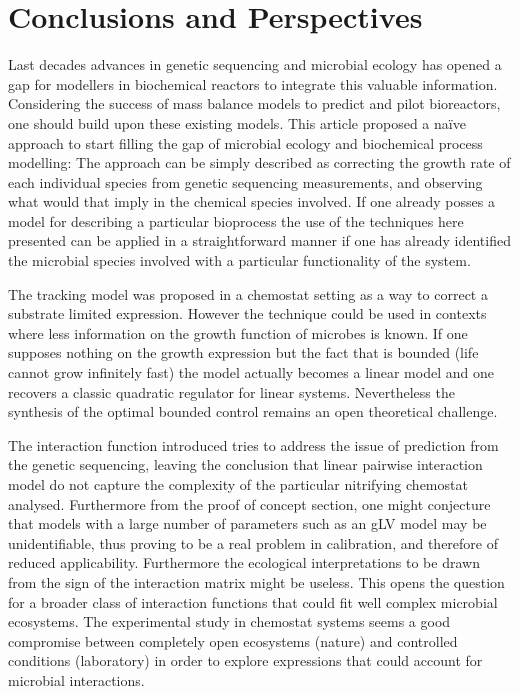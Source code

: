 \documentclass[3p,times]{elsarticle}
\begin{document}
\section{Conclusions and Perspectives}

Last decades advances in genetic sequencing and microbial ecology has opened a gap for modellers in biochemical reactors to integrate this valuable information. Considering the success of mass balance models to predict and pilot bioreactors, one should build upon these existing models. This article proposed a naïve approach to start filling the gap of microbial ecology and biochemical process modelling: The approach can be simply described as correcting the growth rate of each individual species from genetic sequencing measurements, and observing what would that imply in the chemical species involved. If one already posses a model for describing a particular bioprocess the use of the techniques here presented can be applied in a straightforward manner if one has already identified the microbial species involved with a particular functionality of the system.

The tracking model was proposed  in a chemostat setting as a way to correct a substrate limited expression. However the technique could be used in contexts where less information on the growth function of microbes is known. If one supposes nothing on the growth expression but the fact that is bounded (life cannot grow infinitely fast) the model actually becomes a linear model and one recovers a classic quadratic regulator for linear systems. Nevertheless the synthesis of the optimal bounded control remains an open theoretical challenge.

The interaction function introduced tries to address the issue of prediction from the genetic sequencing, leaving the conclusion that linear pairwise interaction model do not capture the complexity of the particular nitrifying chemostat analysed. Furthermore from the proof of concept section, one might conjecture that models with a large number of parameters such as an gLV model may be unidentifiable, thus proving to be a real problem in calibration, and therefore of reduced applicability. Furthermore the ecological interpretations to be drawn from the sign of the interaction matrix might be useless. This opens the question for a broader class of interaction functions that could fit well complex microbial ecosystems. The experimental study in chemostat systems seems a good compromise between completely open ecosystems (nature) and controlled conditions (laboratory) in order to explore expressions that could account for microbial interactions.
\end{document}
